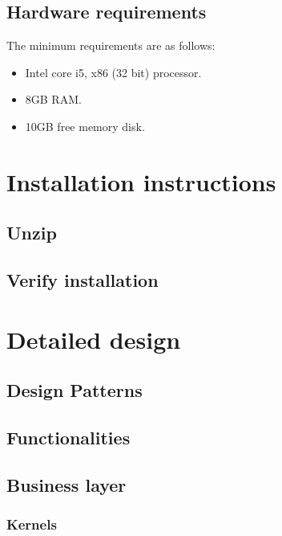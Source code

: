\documentclass[signature]{deltares_report}
\begin{document}
\section{Hardware requirements}
\label{sec:hwRequirements}
The minimum requirements are as follows:
\begin{itemize}
\item Intel core i5, x86 (32 bit) processor.
\item 8GB RAM.
\item 10GB free memory disk.
\end{itemize}

\chapter{Installation instructions}
\label{installation}
\section{Unzip}
\label{sec:Unzip}

\section{Verify installation}
\label{sec:VerificateInstallation}

\chapter{Detailed design}
\label{detailedDesign}

\section{Design Patterns}
\label{sec:designPatterns}


\section{Functionalities}
\label{sec:functionalities}

\section{Business layer}
\label{sec:businessLayer}

\subsection{Kernels}
\label{subsec:kernels}
\end{document}

